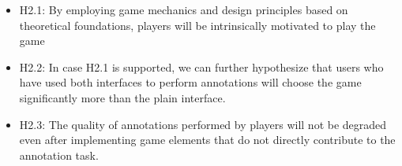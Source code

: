 \begin{itemize}
    \item H2.1: By employing game mechanics and design principles based on theoretical foundations, players will be intrinsically motivated to play the game
    \item H2.2: In case H2.1 is supported, we can further hypothesize that users who have used both interfaces to perform annotations will choose the game significantly more than the plain interface.
    \item H2.3: The quality of annotations performed by players will not be degraded even after implementing game elements that do not directly contribute to the annotation task.
\end{itemize}